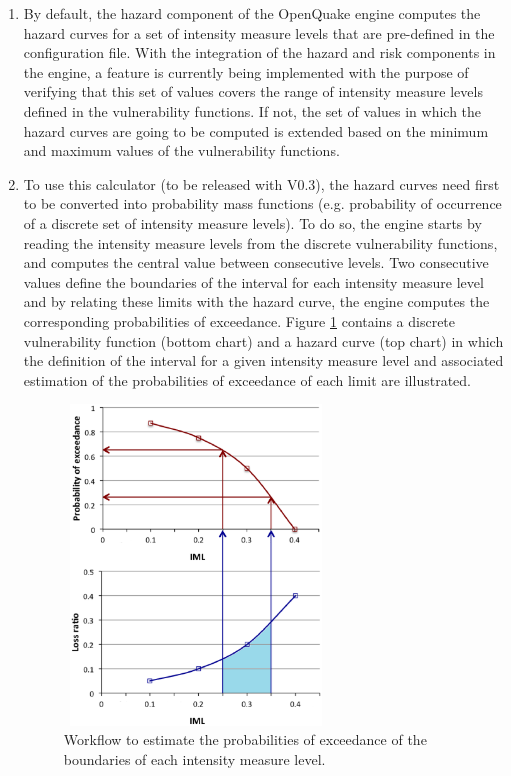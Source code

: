 \begin{enumerate}
\item By default, the hazard component of the OpenQuake engine computes the hazard curves for a set of intensity measure levels that are pre-defined in the configuration file. With the integration of the hazard and risk components in the engine, a feature is currently being implemented with the purpose of verifying that this set of values covers the range of intensity measure levels defined in the vulnerability functions. If not, the set of values in which the hazard curves are going to be computed is extended based on the minimum and maximum values of the vulnerability functions.

\item To use this calculator (to be released with V0.3), the hazard curves need first to be converted into probability mass functions (e.g. probability of occurrence of a discrete set of intensity measure levels). To do so, the engine starts by reading the intensity measure levels from the discrete vulnerability functions, and computes the central value between consecutive levels. Two consecutive values define the boundaries of the interval for each intensity measure level and by relating these limits with the hazard curve, the engine computes the corresponding probabilities of exceedance. Figure \ref{fig:ProbOccurrence} contains a discrete vulnerability function (bottom chart) and a hazard curve (top chart) in which the definition of the interval for a given intensity measure level and associated estimation of the probabilities of exceedance of each limit are illustrated. 

\begin{figure}[ht]
\centering
\includegraphics[width=7cm,height=8.5cm]{./Figures/Part_Risk/ProbOccurrence.eps}
\caption{Workflow to estimate the probabilities of exceedance of the boundaries of each intensity measure level.}
\label{fig:ProbOccurrence}
\end{figure}


\end{enumerate}
